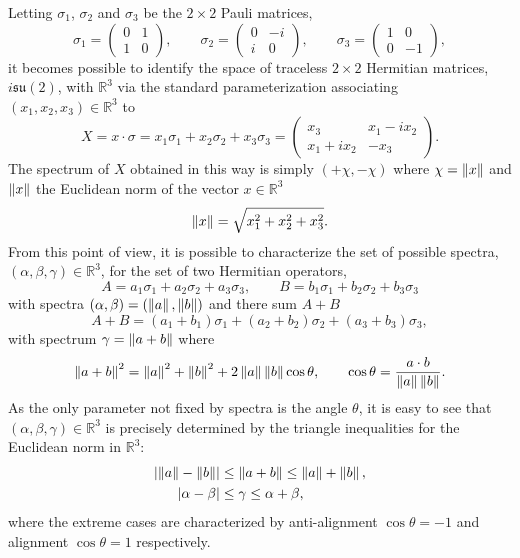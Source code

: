 \documentclass[notitlepage, 10pt]{article}
\begin{document}
Letting $\sigma_1$, $\sigma_2$ and $\sigma_3$ be the $2 \times 2$ Pauli matrices,
\begin{equation}
    \sigma_1 = \begin{pmatrix} 0 & 1 \\ 1 & 0 \end{pmatrix}, \qquad
    \sigma_2 = \begin{pmatrix} 0 & -i \\ i & 0 \end{pmatrix}, \qquad
    \sigma_3 = \begin{pmatrix} 1 & 0 \\ 0 & -1 \end{pmatrix},
\end{equation}
it becomes possible to identify the space of traceless $2\times 2$ Hermitian matrices, $i\mathfrak{su}(2)$, with $\mathbb R^{3}$ via the standard parameterization associating $(x_1, x_2, x_3) \in \mathbb R^{3}$ to
\begin{equation}
    X = x \cdot \sigma = x_1 \sigma_1 + x_2 \sigma_2 + x_3 \sigma_3 = \begin{pmatrix} x_3 & x_1-ix_2 \\ x_1+ix_2 & -x_3 \end{pmatrix}.
\end{equation}
The spectrum of $X$ obtained in this way is simply $(+\chi, -\chi)$ where $\chi = \left\lVert x\right\rVert$ and $\left\lVert x\right\rVert$ the Euclidean norm of the vector $x \in \mathbb R^3$
\begin{equation}
    \left\lVert x\right\rVert = \sqrt{x_1^2 + x_2^2 + x_3^2}.
\end{equation}
From this point of view, it is possible to characterize the set of possible spectra, $(\alpha, \beta, \gamma) \in \mathbb R^{3}$, for the set of two Hermitian operators,
\begin{equation}
    A = a_1 \sigma_1 + a_2 \sigma_2 + a_3 \sigma_3, \qquad B = b_1 \sigma_1 + b_2 \sigma_2 + b_3 \sigma_3
\end{equation}
with spectra $(\alpha, \beta) = (\left\lVert a\right\rVert, \left\lVert b\right\rVert)$ and there sum $A+B$
\begin{equation}
    A+B = (a_1+b_1) \sigma_1 + (a_2+b_2) \sigma_2 + (a_3+b_3) \sigma_3,
\end{equation}
with spectrum $\gamma = \left\lVert a+b\right\rVert$ where
\begin{equation}
    \left\lVert a+b\right\rVert^2 = \left\lVert a\right\rVert^2 + \left\lVert b\right\rVert^{2} + 2 \left\lVert a\right\rVert \left\lVert b\right\rVert \cos \theta, \qquad \cos \theta = \frac{a \cdot b}{\left\lVert a\right\rVert \left\lVert b\right\rVert}.
\end{equation}
As the only parameter not fixed by spectra is the angle $\theta$, it is easy to see that $(\alpha, \beta, \gamma) \in \mathbb R^3$ is precisely determined by the triangle inequalities for the Euclidean norm in $\mathbb R^3$:
\begin{align}
    \left|\left\lVert a\right\rVert - \left\lVert b\right\rVert\right| &\leq \left\lVert a+b\right\rVert \leq \left\lVert a\right\rVert + \left\lVert b\right\rVert, \\
    \left|\alpha - \beta\right| &\leq \gamma \leq \alpha + \beta,
\end{align}
where the extreme cases are characterized by anti-alignment $\cos \theta = -1$ and alignment $\cos \theta = 1$ respectively.
\end{document}
